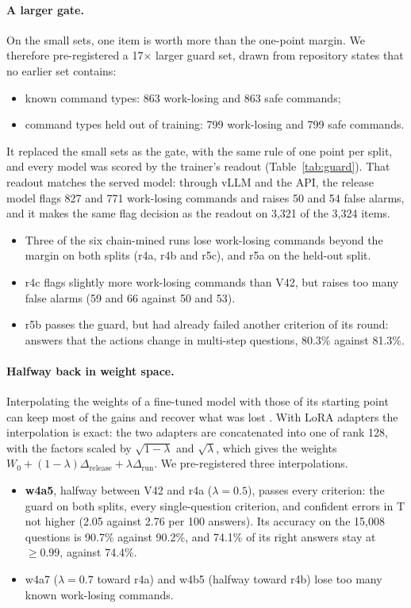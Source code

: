 \documentclass[11pt]{article}
\begin{document}
\paragraph{A larger gate.} On the small sets, one item is worth more than the one-point margin. We therefore
pre-registered a 17$\times$ larger guard set, drawn from repository states that no earlier set contains:
\begin{itemize}
  \item known command types: 863 work-losing and 863 safe commands;
  \item command types held out of training: 799 work-losing and 799 safe commands.
\end{itemize}
It replaced the small sets as the gate, with the same rule of one point per split, and every model was scored by the
trainer's readout (Table~\ref{tab:guard}). That readout matches the served model: through vLLM and the API, the release
model flags 827 and 771 work-losing commands and raises 50 and 54 false alarms, and it makes the same flag decision as
the readout on 3,321 of the 3,324 items.
\begin{itemize}
  \item Three of the six chain-mined runs lose work-losing commands beyond the margin on both splits (r4a, r4b and r5c),
  and r5a on the held-out split.
  \item r4c flags slightly more work-losing commands than V42, but raises too many false alarms (59 and
  66 against 50 and 53).
  \item r5b passes the guard, but had already failed another criterion of its round: answers that the actions change in
  multi-step questions, 80.3\% against 81.3\%.
\end{itemize}

\paragraph{Halfway back in weight space.} Interpolating the weights of a fine-tuned model with those of its starting
point can keep most of the gains and recover what was lost \cite{wortsman2022}. With LoRA adapters the interpolation is
exact: the two adapters are concatenated into one of rank 128, with the factors scaled by $\sqrt{1-\lambda}$ and
$\sqrt{\lambda}$, which gives the weights $W_0 + (1-\lambda)\Delta_{\text{release}} + \lambda\Delta_{\text{run}}$. We
pre-registered three interpolations.
\begin{itemize}
  \item \textbf{w4a5}, halfway between V42 and r4a ($\lambda=0.5$), passes every criterion: the guard on
  both splits, every single-question criterion, and confident errors in T not higher (2.05 against 2.76 per 100
  answers). Its accuracy on the 15,008 questions is 90.7\% against 90.2\%, and 74.1\% of its right answers stay at
  $\ge 0.99$, against 74.4\%.
  \item w4a7 ($\lambda=0.7$ toward r4a) and w4b5 (halfway toward r4b) lose too many known work-losing commands.
\end{itemize}
\end{document}
